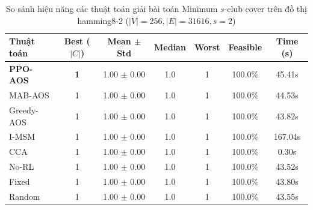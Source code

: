 \begin{table}[htbp]
\centering
\caption{So sánh hiệu năng các thuật toán giải bài toán Minimum $s$-club cover trên đồ thị hamming8-2 ($|V|=256, |E|=31616, s=2$)}
\label{tab:results_hamming8_2}
\begin{tabular}{lcccccc}
\hline
\textbf{Thuật toán} & \textbf{Best ($|C|$)} & \textbf{Mean $\pm$ Std} & \textbf{Median} & \textbf{Worst} & \textbf{Feasible} & \textbf{Time (s)} \\
\hline
\textbf{PPO-AOS} & \textbf{1} & 1.00 $\pm$ 0.00 & 1.0 & 1 & 100.0\% & 45.41s \\
MAB-AOS & 1 & 1.00 $\pm$ 0.00 & 1.0 & 1 & 100.0\% & 44.53s \\
Greedy-AOS & 1 & 1.00 $\pm$ 0.00 & 1.0 & 1 & 100.0\% & 43.82s \\
I-MSM & 1 & 1.00 $\pm$ 0.00 & 1.0 & 1 & 100.0\% & 167.04s \\
CCA & 1 & 1.00 $\pm$ 0.00 & 1.0 & 1 & 100.0\% & 0.30s \\
No-RL & 1 & 1.00 $\pm$ 0.00 & 1.0 & 1 & 100.0\% & 43.52s \\
Fixed & 1 & 1.00 $\pm$ 0.00 & 1.0 & 1 & 100.0\% & 43.80s \\
Random & 1 & 1.00 $\pm$ 0.00 & 1.0 & 1 & 100.0\% & 43.55s \\
\hline
\end{tabular}
\end{table}

